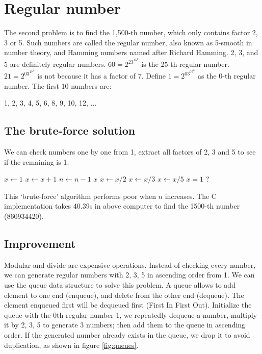 \documentclass[b5paper]{article}
\begin{document}
\section*{Regular number}

The second problem is to find the 1,500-th number, which only contains factor 2, 3 or 5. Such numbers are called the regular number, also known as 5-smooth in number theory, and Hamming numbers named after Richard Hamming. 2, 3, and 5 are definitely regular numbers. $60 = 2^23^15^1$ is the 25-th regular number. $21 = 2^03^17^1$ is not because it has a factor of 7. Define $1=2^03^05^0$ as the 0-th regular number. The first 10 numbers are:

1, 2, 3, 4, 5, 6, 8, 9, 10, 12, ...

\subsection*{The brute-force solution}
We can check numbers one by one from 1, extract all factors of 2, 3 and 5 to see if the remaining is 1:

\begin{algorithmic}[1]
  \State $x \gets 1$
    \State $x \gets x + 1$
      \State $n \gets n - 1$
    \EndIf
  \EndWhile
  \State \Return $x$
\EndFunction
\Statex
{}
    \State $x \gets x / 2$
  \EndWhile
    \State $x \gets x / 3$
  \EndWhile
    \State $x \gets x / 5$
  \EndWhile
  \State \Return $x = 1$ ?
\EndFunction
\end{algorithmic}

This `brute-force' algorithm performs poor when $n$ increases. The C implementation takes 40.39s in above computer to find the 1500-th number (860934420).

\subsection*{Improvement}
Modular and divide are expensive\cite{Bentley} operations. Instead of checking every number, we can generate regular numbers with 2, 3, 5 in ascending order from 1. We can use the queue data structure to solve this problem. A queue allows to add element to one end (enqueue), and delete from the other end (dequeue). The element enqueued first will be dequeued first (First In First Out). Initialize the queue with the 0th regular number 1, we repeatedly dequeue a number, multiply it by 2, 3, 5 to generate 3 numbers; then add them to the queue in ascending order. If the generated number already exists in the queue, we drop it to avoid duplication, as shown in figure \cref{fig:queues}.
\end{document}
